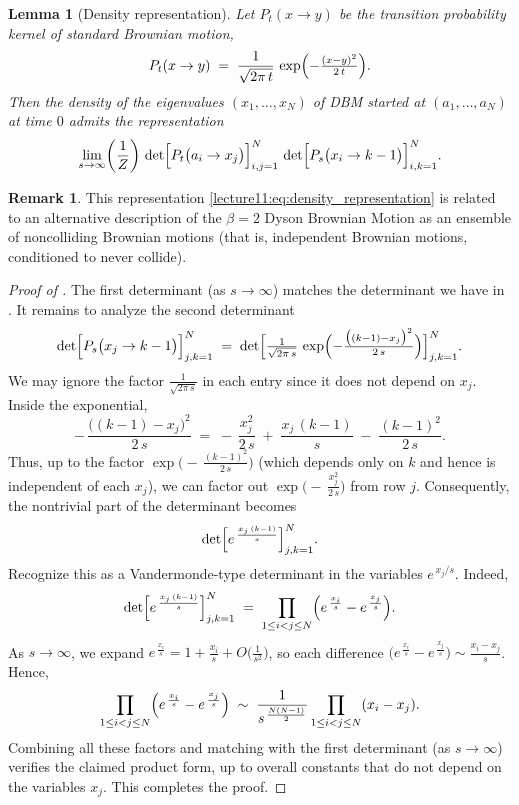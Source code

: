 \documentclass[letterpaper,11pt,oneside,reqno]{book}
\numberwithin{equation}{chapter}  %
\newtheorem{lemma}[proposition]{Lemma}
\theoremstyle{definition}
\newtheorem{remark}[proposition]{Remark}
\begin{document}
\begin{lemma}[Density representation]
\label{lecture11:lem:density_representation}
Let $P_t(x\to y)$ be the transition probability kernel of standard Brownian motion,
\[
   P_t(x\to y) \;=\; \frac{1}{\sqrt{2\pi\,t}}\,
   \exp\Bigl(-\tfrac{(x-y)^2}{2\,t}\Bigr).
\]
Then the density of the eigenvalues $(x_1,\dots,x_N)$
of DBM started at $(a_1,\dots,a_N)$ at time $0$
admits the representation
\begin{equation}
	\label{lecture11:eq:density_representation}
   \lim_{s\to\infty}
   \biggl(\frac1Z\biggr)\,
   \det\Bigl[P_t\bigl(a_i\to x_j\bigr)\Bigr]_{i,j=1}^N
   \,\det\Bigl[P_s\bigl(x_i\to k-1\bigr)\Bigr]_{i,k=1}^N.
 \end{equation}
\end{lemma}
\begin{remark}
	This representation
	\eqref{lecture11:eq:density_representation}
	is related to an alternative description of the
	$\beta=2$ Dyson Brownian Motion as
	an ensemble of noncolliding Brownian motions
	(that is, independent Brownian motions, conditioned to never collide).
\end{remark}

\begin{proof}[Proof of ]
The first determinant (as $s\to\infty$) matches the determinant
we have in .
It remains to analyze the second determinant
\[
   \det\Bigl[
      P_s\bigl(x_j \to k-1\bigr)
   \Bigr]_{j,k=1}^N
   \;=\;
   \det\Bigl[
      \tfrac{1}{\sqrt{2\pi\,s}}\,
      \exp\Bigl(-\tfrac{\bigl((k-1) - x_j\bigr)^2}{2\,s}\Bigr)
   \Bigr]_{j,k=1}^N.
\]
We may ignore the factor \(\tfrac{1}{\sqrt{2\pi\,s}}\) in each entry since it does not depend on \(x_j\).  Inside the exponential,
\[
   -\,\frac{\bigl((k-1) - x_j\bigr)^2}{2\,s}
   \;=\;
   -\,\frac{x_j^2}{2\,s}
   \;+\;\frac{x_j\,(k-1)}{s}
   \;-\;\frac{(k-1)^2}{2\,s}.
\]
Thus, up to the factor
\(\exp\bigl(-\,\tfrac{(k-1)^2}{2\,s}\bigr)\)
(which depends only on \(k\) and hence is independent of each \(x_j\)),
we can factor out
\(\exp\bigl(-\,\tfrac{x_j^2}{2\,s}\bigr)\)
from row \(j\).  Consequently, the nontrivial part of the determinant becomes
\[
   \det\Bigl[
      e^{\,\frac{x_j\,(k-1)}{s}}
   \Bigr]_{j,k=1}^N.
\]
Recognize this as a Vandermonde-type determinant in the variables \(e^{\,x_j/s}\).  Indeed,
\[
   \det\Bigl[
      e^{\,\frac{x_j\,(k-1)}{s}}
   \Bigr]_{j,k=1}^N
   \;=\;
   \prod_{1 \le i<j \le N}
   \Bigl(e^{\,\frac{x_i}{s}} - e^{\,\frac{x_j}{s}}\Bigr).
\]
As \(s \to \infty\), we expand
\(e^{\,\frac{x_i}{s}} = 1 + \frac{x_i}{s} + O\bigl(\tfrac{1}{s^2}\bigr)\),
so each difference
\(\bigl(e^{\,\frac{x_i}{s}} - e^{\,\frac{x_j}{s}}\bigr)
 \sim \tfrac{x_i - x_j}{s}\).
Hence,
\[
   \prod_{1 \le i<j \le N}
   \Bigl(e^{\,\frac{x_i}{s}} - e^{\,\frac{x_j}{s}}\Bigr)
   \;\sim\;
   \frac{1}{s^{\,\frac{N(N-1)}{2}}}
   \prod_{1 \le i<j \le N} (x_i - x_j).
\]
Combining all these factors and matching with the first determinant (as $s\to\infty$) verifies the claimed product form, up to overall constants that do not depend on the variables \(x_j\).  This completes the proof.
\end{proof}
\end{document}
